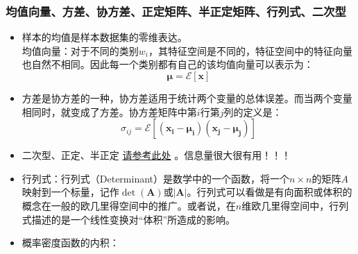 \documentclass[12pt, letterpaper]{article}
\begin{document}
\subsubsection*{均值向量、方差、协方差、正定矩阵、半正定矩阵、行列式、二次型}
\begin{itemize}
\item 样本的均值是样本数据集的零维表达。\\
均值向量：对于不同的类别$w_i$，其特征空间是不同的，特征空间中的特征向量也自然不相同。因此每一个类别都有自己的该均值向量可以表示为：
\begin{equation}
\mathbf{\mu}=\mathscr{E}\left[\mathbf{x}\right]
\end{equation}
\item 方差是协方差的一种，协方差适用于统计两个变量的总体误差。而当两个变量相同时，就变成了方差。协方差矩阵中第$i$行第$j$列的定义是：
\begin{equation}
\sigma_{ij}=\mathscr{E}\left[(\mathbf{x_i}-\mathbf{\mu_i})(\mathbf{x}_\mathbf{j}-\mathbf{\mu_j})\right]
\end{equation}

\item 二次型、正定、半正定 \href{https://www.zhihu.com/question/38902714}{请参考此处} 。信息量很大很有用！！！
\item 行列式：行列式（Determinant）是数学中的一个函数，将一个$n\times n$的矩阵$A$映射到一个标量，记作$\det(\mathbf{A})$或$|\mathbf{A}|$。行列式可以看做是有向面积或体积的概念在一般的欧几里得空间中的推广。或者说，在$n$维欧几里得空间中，行列式描述的是一个线性变换对“体积”所造成的影响。
\item 概率密度函数的内积：
\end{itemize}
\end{document}
